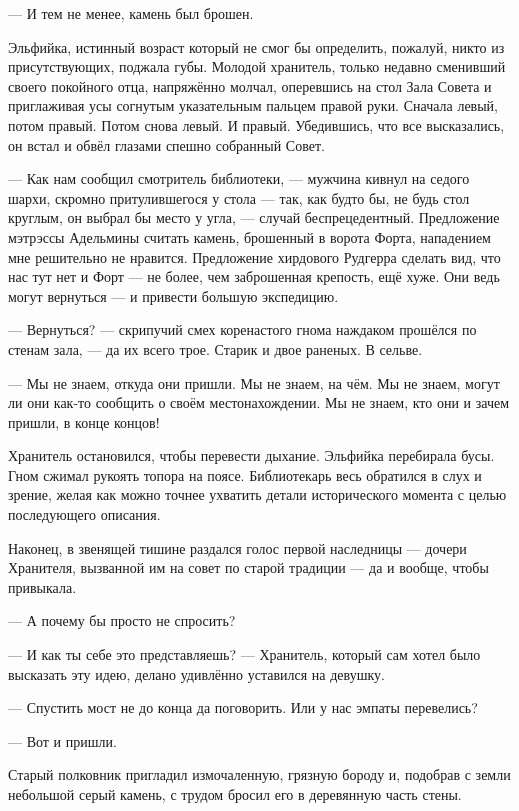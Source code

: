 \emptypar

--- И тем не менее, камень был брошен.

Эльфийка, истинный возраст который не смог бы определить, пожалуй, никто из присутствующих, поджала губы.
Молодой хранитель, только недавно сменивший своего покойного отца, напряжённо молчал,
оперевшись на стол Зала Совета и приглаживая усы согнутым указательным пальцем правой руки.
Сначала левый, потом правый. Потом снова левый. И правый.
Убедившись, что все высказались, он встал и обвёл глазами спешно собранный Совет.

--- Как нам сообщил смотритель библиотеки, --- мужчина кивнул на седого шархи, скромно притулившегося у стола ---
так, как будто бы, не будь стол круглым, он выбрал бы место у угла, --- случай беспрецедентный.
Предложение мэтрэссы Адельмины считать камень, брошенный в ворота Форта, нападением мне решительно не нравится.
Предложение хирдового Рудгерра сделать вид, что нас тут нет и Форт --- не более, чем заброшенная крепость, ещё хуже.
Они ведь могут вернуться --- и привести большую экспедицию.

--- Вернуться? --- скрипучий смех коренастого гнома наждаком прошёлся по стенам зала, --- да их всего трое.
Старик и двое раненых. В сельве.

--- Мы не знаем, откуда они пришли. Мы не знаем, на чём. Мы не знаем, могут ли они как-то сообщить о своём местонахождении.
Мы не знаем, кто они и зачем пришли, в конце концов!

Хранитель остановился, чтобы перевести дыхание. Эльфийка перебирала бусы. Гном сжимал рукоять топора на поясе.
Библиотекарь весь обратился в слух и зрение,
желая как можно точнее ухватить детали исторического момента с целью последующего описания.

Наконец, в звенящей тишине раздался голос первой наследницы --- дочери Хранителя, вызванной им на совет по старой традиции ---
да и вообще, чтобы привыкала.

--- А почему бы просто не спросить?

--- И как ты себе это представляешь? --- Хранитель, который сам хотел было высказать эту идею,
делано удивлённо уставился на девушку.

--- Спустить мост не до конца да поговорить. Или у нас эмпаты перевелись?

\emptypar

--- Вот и пришли.

Старый полковник пригладил измочаленную, грязную бороду и, подобрав с земли небольшой серый камень,
с трудом бросил его в деревянную часть стены.

